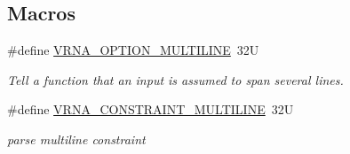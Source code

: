 \subsection*{Macros}
\begin{DoxyCompactItemize}
\item 
\#define \hyperlink{group__file__utils_gabec89c09874528c6cb73140a4c3d86d7}{V\+R\+N\+A\+\_\+\+O\+P\+T\+I\+O\+N\+\_\+\+M\+U\+L\+T\+I\+L\+I\+N\+E}~32\+U
\begin{DoxyCompactList}\small\item\em Tell a function that an input is assumed to span several lines. \end{DoxyCompactList}\item 
\#define \hyperlink{group__file__utils_ga7d725ef525b29891abef3f1ed42599a4}{V\+R\+N\+A\+\_\+\+C\+O\+N\+S\+T\+R\+A\+I\+N\+T\+\_\+\+M\+U\+L\+T\+I\+L\+I\+N\+E}~32\+U
\begin{DoxyCompactList}\small\item\em parse multiline constraint \end{DoxyCompactList}\end{DoxyCompactItemize}
